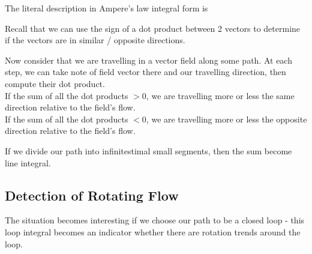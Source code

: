 \documentclass[class=article, crop=false, 12pt]{standalone}
\begin{document}
The literal description in Ampere's law integral form is

Recall that we can use the sign of a dot product between 2 vectors to 
determine if the vectors are in similar / opposite directions. 


Now consider that we are travelling in a vector field along some path.
At each step, 
we can take note of field vector there and our travelling direction,
then compute their dot product.\\

If the sum of all the dot products $>0$, 
we are travelling more or less the same direction relative to the field's flow.\\

If the sum of all the dot products $<0$, 
we are travelling more or less the opposite direction relative to the field's flow.\\


If we divide our path into infinitestimal small segments,
then the sum become line integral.


\subsection{Detection of Rotating Flow}

The situation becomes interesting if we choose our path to be a closed loop - 
this loop integral becomes an indicator whether there are rotation trends around the loop.\\
\end{document}
